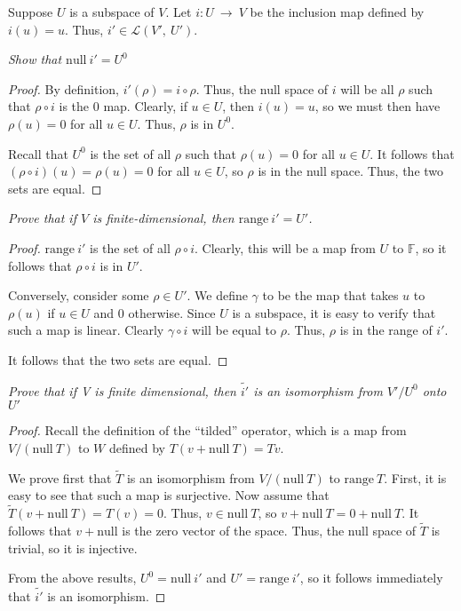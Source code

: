 \documentclass[10pt, oneside]{article}
\newenvironment{problem}[2][Problem]{\begin{trivlist}
\item[\hskip \labelsep {\bfseries #1}\hskip \labelsep {\bfseries #2.}]}{\end{trivlist}}
\begin{document}
    \begin{problem}{3.36}
      Suppose $U$ is a subspace of $V$. Let $i : U \ \rightarrow \ V$ be the inclusion map defined by $i(u) = u$. Thus, $i' \in \mathcal{L}(V', \ U')$.
    \end{problem}

    \textit{Show that $\text{null} \ i' = U^0$}

    \begin{proof}
      By definition, $i'(\rho) = i \circ \rho$. Thus, the null space of $i$ will be all $\rho$ such that $\rho \circ i$ is the $0$ map. Clearly, if $u \in U$, then
      $i(u) = u$, so we must then have $\rho(u) = 0$ for all $u \in U$. Thus, $\rho$ is in $U^{0}$.

      Recall that $U^0$ is
      the set of all $\rho$ such that $\rho(u) = 0$ for all $u \in U$. It follows that $(\rho \circ i)(u) = \rho(u) = 0$ for all $u \in U$, so $\rho$ is in the null space. Thus,
      the two sets are equal.
    \end{proof}

    \textit{Prove that if $V$ is finite-dimensional, then $\text{range} \ i' = U'$.}

    \begin{proof}
      $\text{range} \ i'$ is the set of all $\rho \circ i$. Clearly, this will be a map from $U$ to $\mathbb{F}$, so it follows that $\rho \circ i$ is in $U'$.
      \newline

      Conversely, consider some $\rho \in U'$. We define $\gamma$ to be the map that takes $u$ to $\rho(u)$ if $u \in U$ and $0$ otherwise. Since $U$ is a subspace,
      it is easy to verify that such a map is linear. Clearly $\gamma \circ i$ will be equal to $\rho$. Thus, $\rho$ is in the range of $i'$.
      \newline

      It follows that the two sets are equal.
    \end{proof}

    \textit{Prove that if V is finite dimensional, then $\tilde{i'}$ is an isomorphism from $V' / U^{0}$ onto $U'$}

    \begin{proof}
      Recall the definition of the ``tilded'' operator, which is a map from $V/(\text{null} \ T)$ to $W$ defined by $T(v + \text{null} \ T) = Tv$.
      \newline

      We prove first that $\tilde{T}$ is an isomorphism from $V/(\text{null} \ T)$ to $\text{range} \ T$. First, it is easy to see that such a map is surjective.
      Now assume that $\tilde{T}(v + \text{null} \ T) = T(v) = 0$. Thus, $v \in \text{null} \ T$, so $v + \text{null} \ T = 0 + \text{null} \ T$. It follows that
      $v + \text{null}$ is the zero vector of the space. Thus, the null space of $\tilde{T}$ is trivial, so it is injective.
      \newline

      From the above results, $U^{0} = \text{null} \ i'$ and $U' = \text{range} \ i'$, so it follows immediately that $\tilde{i'}$ is an isomorphism.
    \end{proof}
\end{document}
